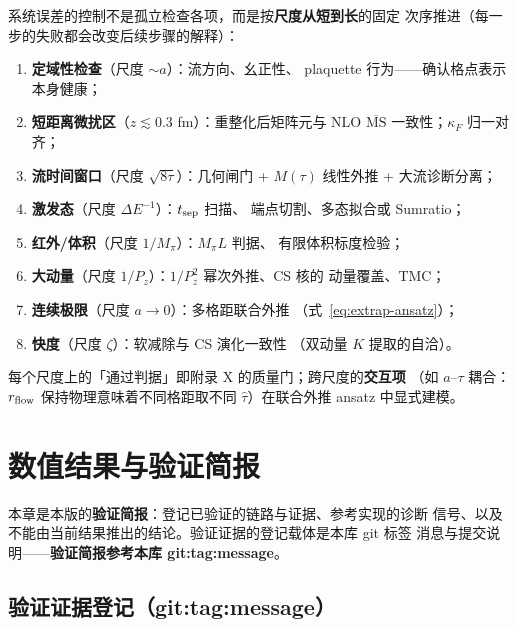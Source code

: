 \documentclass[11pt,a4paper]{ctexart}
\newcommand{\MSbarM}{\overline{\text{MS}}}
\newcommand{\zzh}{\widehat{\tau}}
\begin{document}
系统误差的控制不是孤立检查各项，而是按\textbf{尺度从短到长}的固定
次序推进（每一步的失败都会改变后续步骤的解释）：
\begin{enumerate}
  \item \textbf{定域性检查}（尺度 $\sim a$）：流方向、幺正性、
  plaquette 行为——确认格点表示本身健康；
  \item \textbf{短距离微扰区}（$z\lesssim0.3$ fm）：重整化后矩阵元与
  NLO $\MSbarM$ 一致性；$\kappa_F$ 归一对齐；
  \item \textbf{流时间窗口}（尺度 $\sqrt{8\tau}$）：几何闸门 +
  $M(\tau)$ 线性外推 + 大流诊断分离；
  \item \textbf{激发态}（尺度 $\Delta E^{-1}$）：$t_{\rm sep}$ 扫描、
  端点切割、多态拟合或 Sumratio；
  \item \textbf{红外/体积}（尺度 $1/M_\pi$）：$M_\pi L$ 判据、
  有限体积标度检验；
  \item \textbf{大动量}（尺度 $1/P_z$）：$1/P_z^2$ 幂次外推、CS 核的
  动量覆盖、TMC；
  \item \textbf{连续极限}（尺度 $a\to0$）：多格距联合外推
  （式~\eqref{eq:extrap-ansatz}）；
  \item \textbf{快度}（尺度 $\zeta$）：软减除与 CS 演化一致性
  （双动量 $K$ 提取的自洽）。
\end{enumerate}
每个尺度上的「通过判据」即附录 X 的质量门；跨尺度的\textbf{交互项}
（如 $a$--$\tau$ 耦合：$r_{\rm flow}$ 保持物理意味着不同格距取不同
$\zzh$）在联合外推 ansatz 中显式建模。

\section{数值结果与验证简报}
\label{sec:results}

本章是本版的\textbf{验证简报}：登记已验证的链路与证据、参考实现的诊断
信号、以及不能由当前结果推出的结论。验证证据的登记载体是本库 git 标签
消息与提交说明——\textbf{验证简报参考本库 git:tag:message}。

\subsection{验证证据登记（git:tag:message）}
\end{document}
